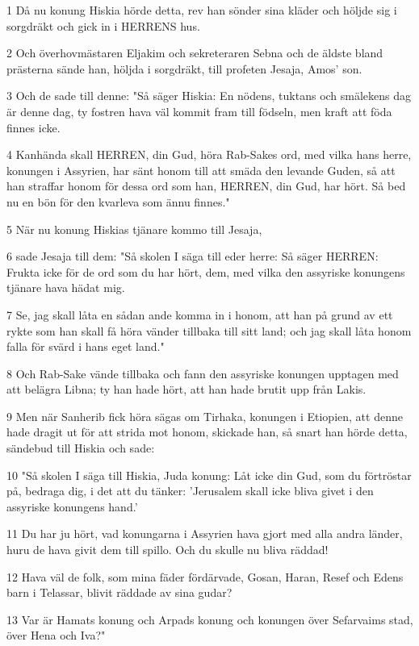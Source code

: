 \par 1 Då nu konung Hiskia hörde detta, rev han sönder sina kläder och höljde sig i sorgdräkt och gick in i HERRENS hus.
\par 2 Och överhovmästaren Eljakim och sekreteraren Sebna och de äldste bland prästerna sände han, höljda i sorgdräkt, till profeten Jesaja, Amos' son.
\par 3 Och de sade till denne: "Så säger Hiskia: En nödens, tuktans och smälekens dag är denne dag, ty fostren hava väl kommit fram till födseln, men kraft att föda finnes icke.
\par 4 Kanhända skall HERREN, din Gud, höra Rab-Sakes ord, med vilka hans herre, konungen i Assyrien, har sänt honom till att smäda den levande Guden, så att han straffar honom för dessa ord som han, HERREN, din Gud, har hört. Så bed nu en bön för den kvarleva som ännu finnes."
\par 5 När nu konung Hiskias tjänare kommo till Jesaja,
\par 6 sade Jesaja till dem: "Så skolen I säga till eder herre: Så säger HERREN: Frukta icke för de ord som du har hört, dem, med vilka den assyriske konungens tjänare hava hädat mig.
\par 7 Se, jag skall låta en sådan ande komma in i honom, att han på grund av ett rykte som han skall få höra vänder tillbaka till sitt land; och jag skall låta honom falla för svärd i hans eget land."
\par 8 Och Rab-Sake vände tillbaka och fann den assyriske konungen upptagen med att belägra Libna; ty han hade hört, att han hade brutit upp från Lakis.
\par 9 Men när Sanherib fick höra sägas om Tirhaka, konungen i Etiopien, att denne hade dragit ut för att strida mot honom, skickade han, så snart han hörde detta, sändebud till Hiskia och sade:
\par 10 "Så skolen I säga till Hiskia, Juda konung: Låt icke din Gud, som du förtröstar på, bedraga dig, i det att du tänker: 'Jerusalem skall icke bliva givet i den assyriske konungens hand.'
\par 11 Du har ju hört, vad konungarna i Assyrien hava gjort med alla andra länder, huru de hava givit dem till spillo. Och du skulle nu bliva räddad!
\par 12 Hava väl de folk, som mina fäder fördärvade, Gosan, Haran, Resef och Edens barn i Telassar, blivit räddade av sina gudar?
\par 13 Var är Hamats konung och Arpads konung och konungen över Sefarvaims stad, över Hena och Iva?"
